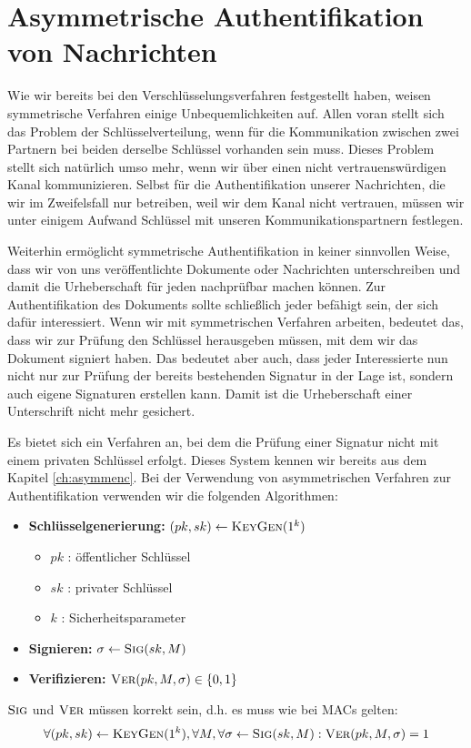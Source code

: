 \chapter{Asymmetrische Authentifikation von
  Nachrichten}\indexMessageAuthAsymm
\label{cha:asymmauth}

Wie wir bereits bei den Verschlüsselungsverfahren festgestellt haben,
weisen symmetrische Verfahren einige Unbequemlichkeiten auf. Allen voran
stellt sich das Problem der Schlüsselverteilung, wenn für die
Kommunikation zwischen zwei Partnern bei beiden derselbe Schlüssel
vorhanden sein muss. Dieses Problem stellt sich natürlich umso mehr,
wenn wir über einen nicht vertrauenswürdigen Kanal kommunizieren. Selbst
für die Authentifikation unserer Nachrichten, die wir im Zweifelsfall
nur betreiben, weil wir dem Kanal nicht vertrauen, müssen wir unter
einigem Aufwand Schlüssel mit unseren Kommunikationspartnern festlegen.

Weiterhin ermöglicht symmetrische Authentifikation in keiner sinnvollen
Weise, dass wir von uns veröffentlichte Dokumente oder Nachrichten
unterschreiben und damit die Urheberschaft für jeden nachprüfbar machen
können. Zur Authentifikation des Dokuments sollte schließlich jeder
befähigt sein, der sich dafür interessiert. Wenn wir mit symmetrischen
Verfahren arbeiten, bedeutet das, dass wir zur Prüfung den Schlüssel
herausgeben müssen, mit dem wir das Dokument signiert haben. Das
bedeutet aber auch, dass jeder Interessierte nun nicht nur zur Prüfung
der bereits bestehenden Signatur in der Lage ist, sondern auch eigene
Signaturen erstellen kann. Damit ist die Urheberschaft einer
Unterschrift nicht mehr gesichert.

Es bietet sich ein Verfahren an, bei dem die Prüfung einer Signatur
nicht mit einem privaten Schlüssel erfolgt. Dieses System kennen wir
bereits aus dem Kapitel \ref{ch:asymmenc}. Bei der Verwendung von
asymmetrischen Verfahren zur Authentifikation verwenden wir die
folgenden Algorithmen:
\begin{itemize}
\item \textbf{Schlüsselgenerierung:} $(pk, sk) \leftarrow
  \textsc{KeyGen}(1^k)$
  \begin{itemize}
  \item $pk$ : öffentlicher Schlüssel
  \item $sk$ : privater Schlüssel
  \item $k$ : Sicherheitsparameter
  \end{itemize}
\item \textbf{Signieren:} $\sigma \leftarrow \textsc{Sig}(sk,M)$
\item \textbf{Verifizieren:} $\textsc{Ver}(pk,M,\sigma) \in \{ 0,1 \}$
\end{itemize} $\textsc{Sig}$ und $\textsc{Ver}$ müssen korrekt sein, d.h. es muss wie
bei MACs gelten:
\begin{equation*} \forall (pk,sk) \leftarrow \textsc{KeyGen}(1^k), \forall M,
  \forall \sigma \leftarrow \textsc{Sig}(sk,M) : \textsc{Ver}(pk,M,\sigma) = 1
\end{equation*}

